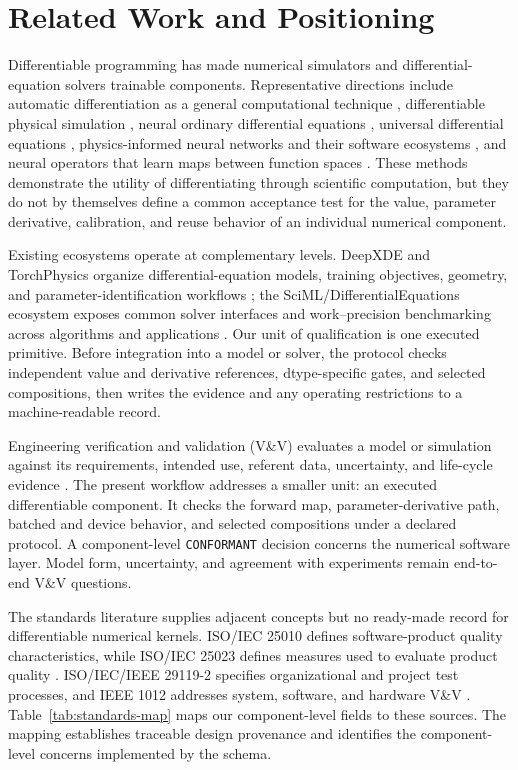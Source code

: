 \documentclass[preprint,12pt,authoryear]{elsarticle}
\begin{document}
\section{Related Work and Positioning}
Differentiable programming has made numerical simulators and differential-equation solvers trainable components. Representative directions include automatic differentiation as a general computational technique \citep{baydin2018autodiff}, differentiable physical simulation \citep{hu2020difftaichi,holl2020control}, neural ordinary differential equations \citep{chen2018neuralode}, universal differential equations \citep{rackauckas2020universal}, physics-informed neural networks and their software ecosystems \citep{raissi2019pinn,lu2021deepxde}, and neural operators that learn maps between function spaces \citep{kovachki2023neuraloperator}. These methods demonstrate the utility of differentiating through scientific computation, but they do not by themselves define a common acceptance test for the value, parameter derivative, calibration, and reuse behavior of an individual numerical component.

Existing ecosystems operate at complementary levels. DeepXDE and TorchPhysics organize differential-equation models, training objectives, geometry, and parameter-identification workflows \citep{lu2021deepxde,tanyu2023deeppde}; the SciML/DifferentialEquations ecosystem exposes common solver interfaces and work--precision benchmarking across algorithms and applications \citep{rackauckas2019confederated}. Our unit of qualification is one executed primitive. Before integration into a model or solver, the protocol checks independent value and derivative references, dtype-specific gates, and selected compositions, then writes the evidence and any operating restrictions to a machine-readable record.

Engineering verification and validation (V\&V) evaluates a model or simulation against its requirements, intended use, referent data, uncertainty, and life-cycle evidence \citep{nasa2024std7009}. The present workflow addresses a smaller unit: an executed differentiable component. It checks the forward map, parameter-derivative path, batched and device behavior, and selected compositions under a declared protocol. A component-level \texttt{CONFORMANT} decision concerns the numerical software layer. Model form, uncertainty, and agreement with experiments remain end-to-end V\&V questions.

The standards literature supplies adjacent concepts but no ready-made record for differentiable numerical kernels. ISO/IEC 25010 defines software-product quality characteristics, while ISO/IEC 25023 defines measures used to evaluate product quality \citep{iso25010_2023,iso25023_2016}. ISO/IEC/IEEE 29119-2 specifies organizational and project test processes, and IEEE 1012 addresses system, software, and hardware V\&V \citep{iso29119_2_2021,ieee1012_2024}. Table~\ref{tab:standards-map} maps our component-level fields to these sources. The mapping establishes traceable design provenance and identifies the component-level concerns implemented by the schema.
\end{document}

